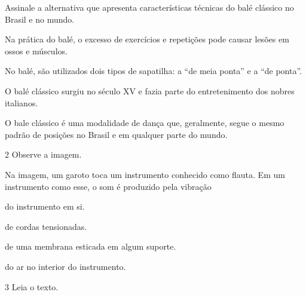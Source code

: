 
Assinale a alternativa que apresenta características técnicas do balé
clássico no Brasil e no mundo.

\begin{escolha}
\item
  Na prática do balé, o excesso de exercícios e repetições pode causar
  lesões em ossos e músculos.
\item
  No balé, são utilizados dois tipos de sapatilha: a “de meia ponta” e
  a “de ponta”.
\item
  O balé clássico surgiu no século XV e fazia parte do entretenimento
  dos nobres italianos.
\item
  O bale clássico é uma modalidade de dança que, geralmente, segue o
  mesmo padrão de posições no Brasil e em qualquer parte do mundo.
\end{escolha}


\num{2} Observe a imagem.


Na imagem, um garoto toca um instrumento conhecido como flauta. Em um instrumento como esse, o som é produzido pela vibração

\begin{minipage}{.5\textwidth}
\begin{escolha}
\item
  do instrumento em si.
\item
  de cordas tensionadas.
\item
  de uma membrana esticada em algum suporte.
\item
  do ar no interior do instrumento.
\end{escolha}
\end{minipage}

\num{3}  Leia o texto.

